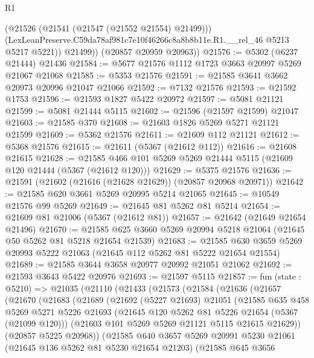 \begin{lexlean}{R1}
\begin{coremodule}
            (@21526 (@21541 (@21547 (@21552 @21554) @21499)))
            (LexLeanPreserve.C59da78af981c7e10f46266c8a8b8b11e.R1.__rel_46 @5213 @5217 @5221))
          @21499))
      (@20857 @20959 @20963))
@21576 := @5302 (@6237 @21444) @21436
@21584 := @5677 @21576 @1112 @1723 @3663 @20997 @5269 @21067 @21068
@21585 := @5353 @21576
@21591 := @21585 @3641 @3662 @20973 @20996 @21047 @21066
@21592 := @7132 @21576
@21593 := @21592 @1753
@21596 := @21593 @1827 @5422 @20972
@21597 := @5081 @21121
@21599 := @5081 @21444 @5115
@21602 := @21596 (@21597 @21599) @21047
@21603 := @21585 @370
@21608 := @21603 @1826 @5269 @5271 @21121 @21599
@21609 := @5362 @21576
@21611 := @21609 @112 @21121
@21612 := @5368 @21576
@21615 := @21611 (@5367 (@21612 @112))
@21616 := @21608 @21615
@21628 := @21585 @466 @101 @5269 @5269 @21444 @5115 (@21609 @120 @21444 (@5367 (@21612 @120)))
@21629 := @5375 @21576
@21636 := @21591 (@21602 (@21616 (@21628 @21629)) (@20857 @20968 @20971))
@21642 := @21585 @620 @3661 @5269 @20995 @5214 @21065
@21645 := @10549 @21576 @99 @5269
@21649 := @21645 @81 @5262 @81 @5214
@21654 := @21609 @81 @21006 (@5367 (@21612 @81))
@21657 := @21642 (@21649 @21654 @21496)
@21670 := @21585 @625 @3660 @5269 @20994 @5218 @21064 (@21645 @50 @5262 @81 @5218 @21654 @21539)
@21683 := @21585 @630 @3659 @5269 @20993 @5222 @21063 (@21645 @112 @5262 @81 @5222 @21654 @21554)
@21689 := @21585 @3644 @3658 @20977 @20992 @21051 @21062
@21692 := @21593 @3643 @5422 @20976
@21693 := @21597 @5115
@21857 := fun (state : @5210) =>
  @21035
    (@21110
      (@21433
        (@21573
          (@21584
            (@21636
              (@21657
                (@21670
                  (@21683
                    (@21689
                      (@21692
                        (@5227 @21693)
                        @21051
                        (@21585
                          @635
                          @458
                          @5269
                          @5271
                          @5226
                          @21693
                          (@21645 @120 @5262 @81 @5226 @21654 (@5367 (@21099 @120)))
                          (@21603 @101 @5269 @5269 @21121 @5115 @21615 @21629))
                        (@20857 @5225 @20968))
                      (@21585
                        @640
                        @3657
                        @5269
                        @20991
                        @5230
                        @21061
                        (@21645 @136 @5262 @81 @5230 @21654 @21203)
                        (@21585
                          @645
                          @3656

\end{coremodule}
\end{lexlean}
